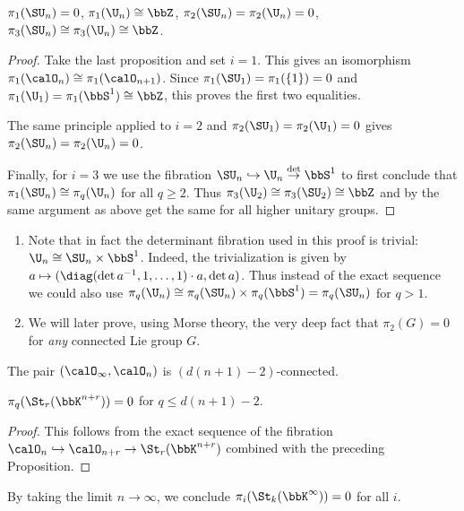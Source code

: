 \begin{cor}
    $\pi_1(\SU_n)=0$, $\pi_1(\U_n)\cong \bbZ$, $\pi_2(\SU_n)=\pi_2(\U_n)=0$, $\pi_3(\SU_n)\cong \pi_3(\U_n)\cong\bbZ$.
\end{cor}
\begin{proof}
    Take the last proposition and set $i=1$. This gives an isomorphism $\pi_1(\calO_n)\cong \pi_1(\calO_{n+1})$. Since $\pi_1(\SU_1)=\pi_1(\{1\})=0$ and $\pi_1(\U_1)=\pi_1(\bbS^1)\cong\bbZ$, this proves the first two equalities. 

    The same principle applied to $i=2$ and $\pi_2(\SU_1)=\pi_2(\U_1)=0$ gives $\pi_2(\SU_n)=\pi_2(\U_n)=0$.

    Finally, for $i=3$ we use the fibration $\SU_n\hookrightarrow \U_n\overset{\det}{\to} \bbS^1$ to first conclude that $\pi_1(\SU_n)\cong \pi_q(\U_n)$ for all $q\geq 2$. Thus $\pi_3(\U_2)\cong \pi_3(\SU_2)\cong\bbZ$ and by the same argument as above get the same for all higher unitary groups.
\end{proof}
\begin{rem}
\begin{enumerate}
    \item Note that in fact the determinant fibration used in this proof is trivial: $\U_n\cong \SU_n\times \bbS^1$. Indeed, the trivialization is given by $a\mapsto (\diag(\det a^{-1},1,\ldots,1)\cdot a,\det a)$. Thus instead of the exact sequence we could also use $\pi_q(\U_n)\cong\pi_q(\SU_n)\times \pi_q(\bbS^1)=\pi_q(\SU_n)$ for $q>1$.
    \item We will later prove, using Morse theory, the very deep fact that $\pi_2(G)=0$ for \emph{any} connected Lie group $G$.
\end{enumerate}
\end{rem}



\begin{cor}
    The pair $(\calO_\infty,\calO_n)$ is $(d(n+1)-2)$-connected.
\end{cor}

\begin{cor}
    $\pi_q(\St_r(\bbK^{n+r}))=0$ for $q\leq d(n+1)-2$.
\end{cor}
\begin{proof}
    This follows from the exact sequence of the fibration $\calO_n\hookrightarrow \calO_{n+r}\to \St_{r}(\bbK^{n+r})$ combined with the preceding Proposition.
\end{proof}
\begin{cor}
    By taking the limit $n\to\infty$, we conclude $\pi_i(\St_k(\bbK^\infty))=0$ for all $i$.
\end{cor}

